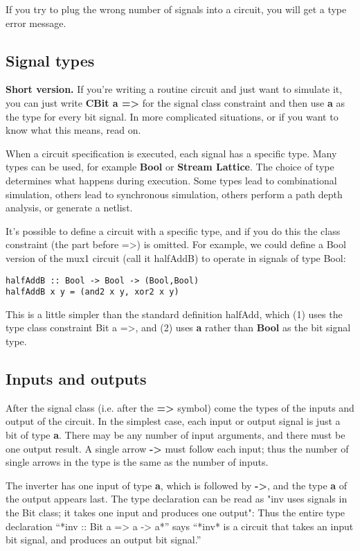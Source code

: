\documentclass[11pt]{article}
\begin{document}
If you try to plug the wrong number of signals into a circuit, you
will get a type error message.

\subsection{Signal types}
\label{sec:org9656e50}

\textbf{Short version.} If you're writing a routine circuit and just want to
simulate it, you can just write \textbf{CBit a =>} for the signal class
constraint and then use \textbf{a} as the type for every bit signal.  In more
complicated situations, or if you want to know what this means, read
on.

When a circuit specification is executed, each signal has a specific
type.  Many types can be used, for example \textbf{Bool} or \textbf{Stream Lattice}.
The choice of type determines what happens during execution.  Some
types lead to combinational simulation, others lead to synchronous
simulation, others perform a path depth analysis, or generate a
netlist.

It's possible to define a circuit with a specific type, and if you do
this the class constraint (the part before =>) is omitted.  For
example, we could define a Bool version of the mux1 circuit (call it
halfAddB) to operate in signals of type Bool:

\begin{verbatim}
halfAddB :: Bool -> Bool -> (Bool,Bool)
halfAddB x y = (and2 x y, xor2 x y)
\end{verbatim}


This is a little simpler than the standard definition halfAdd, which
(1) uses the type class constraint Bit a =>, and (2) uses \textbf{a} rather
than \textbf{Bool} as the bit signal type.

\subsection{Inputs and outputs}
\label{sec:orgbd49221}

After the signal class (i.e. after the \textbf{=>} symbol) come the types of
the inputs and output of the circuit.  In the simplest case, each
input or output signal is just a bit of type \textbf{a}.  There may be any
number of input arguments, and there must be one output result.  A
single arrow \textbf{->} must follow each input; thus the number of single
arrows in the type is the same as the number of inputs.

The inverter has one input of type \textbf{a}, which is followed by \textbf{->}, and
the type \textbf{a} of the output appears last.  The type declaration can be
read as "inv uses signals in the Bit class; it takes one input and
produces one output":
Thus the entire type declaration ``*inv :: Bit a => a -> a*'' says
``*inv* is a circuit that takes an input bit signal, and produces an
output bit signal.''
\end{document}

